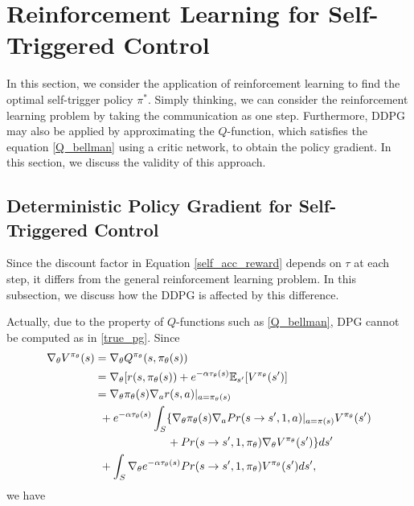 \documentclass[english, dvipdfmx]{ampmt}             %
\newcommand{\expect}{\mathbb{E}}
\begin{document}
\section{Reinforcement Learning for Self-Triggered Control}
In this section, we consider the application of reinforcement learning to find the optimal self-trigger policy $\pi^{*}$. Simply thinking, we can consider the reinforcement learning problem by taking the communication as one step. Furthermore, DDPG may also be applied by approximating the $Q$-function, which satisfies the equation \eqref{Q_bellman} using a critic network, to obtain the policy gradient. In this section, we discuss the validity of this approach.

\subsection{Deterministic Policy Gradient for Self-Triggered Control}
Since the discount factor in Equation \eqref{self_acc_reward} depends on $\tau$ at each step, it differs from the general reinforcement learning problem. In this subsection, we discuss how the DDPG is affected by this difference. \par
Actually, due to the property of $Q$-functions such as \eqref{Q_bellman}, DPG cannot be computed as in \eqref{true_pg}. Since 
\begin{align}
	\nabla_{\theta}V^{\pi_{\theta}}(s) &= \nabla_{\theta}Q^{\pi_{\theta}}(s, \pi_{\theta}(s)) \nonumber \\
	&= \nabla_{\theta}[r(s, \pi_{\theta}(s)) + e^{-\alpha\tau_{\theta}(s)}\expect_{s^{\prime}}[V^{\pi_{\theta}}(s^{\prime})] \nonumber \\
	&= \nabla_{\theta}\pi_{\theta}(s)\nabla_ar(s,a)|_{a=\pi_{\theta}(s)} \nonumber \\
	&\hspace{1ex}+e^{-\alpha\tau_{\theta}(s)}\int_{S}\{\nabla_{\theta}\pi_{\theta}(s)\nabla_aPr(s\to s^{\prime},1,a)|_{a=\pi(s)}V^{\pi_{\theta}}(s^{\prime})\nonumber\\
	&\hspace{15ex}+Pr(s\to s^{\prime}, 1, \pi_{\theta})\nabla_{\theta}V^{\pi_{\theta}}(s^{\prime})\}ds^{\prime}\nonumber \\
	&\hspace{1ex}+\int_{S}\nabla_{\theta}e^{-\alpha\tau_{\theta}(s)}Pr(s\to s^{\prime}, 1, \pi_{\theta})V^{\pi_{\theta}}(s^{\prime})ds^{\prime},
\end{align}
we have
\end{document}
